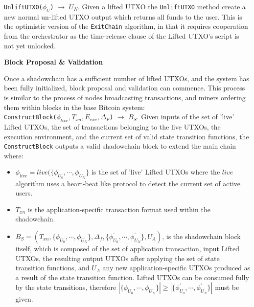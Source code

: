 \documentclass[10pt,a4paper]{article}
\theoremstyle{definition}
\begin{document}
\texttt{UnliftUTXO($\phi_{U}$)} $\rightarrow$ $U_{N}$. Given a lifted UTXO the
\texttt{UnliftUTXO} method create a new normal un-lifted UTXO output
which returns all funds to the user. This is the optimistic version of the
\texttt{ExitChain} algorithm, in that it requires cooperation from the
orchestrator as the time-release clause of the Lifted UTXO's script is not yet
unlocked.


\begin{center}
    \textbf{Block Proposal \& Validation}
\end{center}

Once a shadowchain has a sufficient number of lifted UTXOs, and the system has
been fully initialized, block proposal and validation can commence. This
process is similar to the process of nodes broadcasting transactions, and
miners ordering them within blocks in the base Bitcoin system: \\

\texttt{ConstructBlock($\phi_{live}, T_{xn}, E_{exe}, \Delta_F$)} $\rightarrow$
$B_S$. Given inputs of the set of 'live' Lifted UTXOs, the set of transactions
belonging to the live UTXOs, the execution environment, and the current set of
valid state transition
functions, the \texttt{ConstructBlock} outputs a valid shadowchain block to
extend the main chain where: 
\begin{itemize}
    \item $\phi_{live} = live(\{\phi_{U_0}, \cdots, \phi_{U_N}\}$ is the set of
            'live' Lifted UTXOs where the $live$ algorithm uses a heart-beat
            like protocol to detect the current set of active users.

    \item $T_{xn}$ is the application-specific transaction format used within
        the shadowchain.

    \item $B_S = (T_{xn}, \{\phi_{U_0}, \cdots, \phi_{U_N}\}, \Delta_{f},
        \{\phi_{U_0}^\prime, \cdots, \phi_{U_N}^\prime\}, U_{A})$, is the
        shadowchain block itself, which is composed of the set of application
        transaction, input Lifted UTXOs, the resulting output UTXOs after
        applying the set of state transition functions, and $U_{A}$ any new
        application-specific UTXOs produced as a result of the state transition
        function. Lifted UTXOs can be consumed fully by the state transitions,
        therefore $|\{\phi_{U_0}, \cdots, \phi_{U_N}\}| \geq
        |\{\phi_{U_0}^\prime, \cdots, \phi_{U_N}^\prime\}|$ must be given.
\end{itemize}
\end{document}
